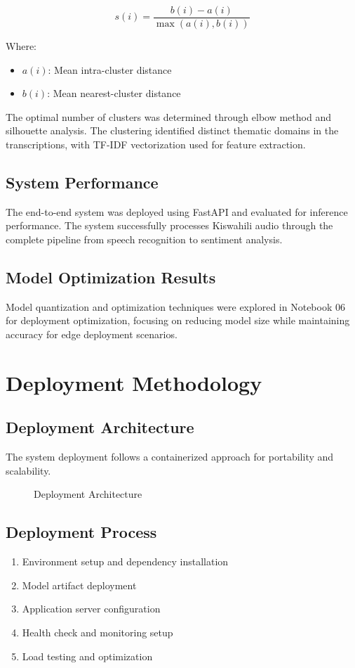 \documentclass[12pt,a4paper]{report}
\begin{document}
$$s(i) = \frac{b(i) - a(i)}{\max(a(i), b(i))}$$

Where:
\begin{itemize}
    \item $a(i)$: Mean intra-cluster distance
    \item $b(i)$: Mean nearest-cluster distance
\end{itemize}

The optimal number of clusters was determined through elbow method and silhouette analysis. The clustering identified distinct thematic domains in the transcriptions, with TF-IDF vectorization used for feature extraction.

\subsection{System Performance}
The end-to-end system was deployed using FastAPI and evaluated for inference performance. The system successfully processes Kiswahili audio through the complete pipeline from speech recognition to sentiment analysis.

\subsection{Model Optimization Results}
Model quantization and optimization techniques were explored in Notebook 06 for deployment optimization, focusing on reducing model size while maintaining accuracy for edge deployment scenarios.

\section{Deployment Methodology}
\subsection{Deployment Architecture}
The system deployment follows a containerized approach for portability and scalability.

\begin{figure}[H]
    \centering
    
    \caption{Deployment Architecture}
    \label{fig:deployment_architecture}
\end{figure}

\subsection{Deployment Process}
\begin{enumerate}
    \item Environment setup and dependency installation
    \item Model artifact deployment
    \item Application server configuration
    \item Health check and monitoring setup
    \item Load testing and optimization
\end{enumerate}
\end{document}
